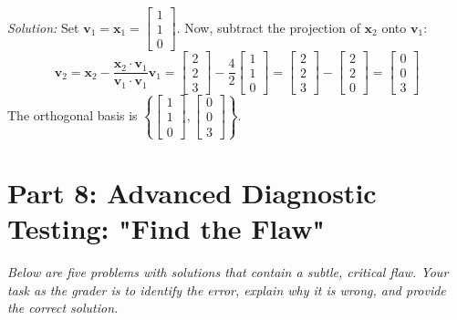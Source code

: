 \documentclass[11pt, letterpaper]{article}
\theoremstyle{definition}
\theoremstyle{remark}
\begin{document}
\textit{Solution:}
Set $\mathbf{v}_1 = \mathbf{x}_1 = \begin{bmatrix} 1 \\ 1 \\ 0 \end{bmatrix}$.
Now, subtract the projection of $\mathbf{x}_2$ onto $\mathbf{v}_1$:
\[ \mathbf{v}_2 = \mathbf{x}_2 - \frac{\mathbf{x}_2 \cdot \mathbf{v}_1}{\mathbf{v}_1 \cdot \mathbf{v}_1}\mathbf{v}_1 = \begin{bmatrix} 2 \\ 2 \\ 3 \end{bmatrix} - \frac{4}{2}\begin{bmatrix} 1 \\ 1 \\ 0 \end{bmatrix} = \begin{bmatrix} 2 \\ 2 \\ 3 \end{bmatrix} - \begin{bmatrix} 2 \\ 2 \\ 0 \end{bmatrix} = \begin{bmatrix} 0 \\ 0 \\ 3 \end{bmatrix} \]
The orthogonal basis is $\left\{ \begin{bmatrix} 1 \\ 1 \\ 0 \end{bmatrix}, \begin{bmatrix} 0 \\ 0 \\ 3 \end{bmatrix} \right\}$.

\newpage
\section{Part 8: Advanced Diagnostic Testing: "Find the Flaw"}

\textit{Below are five problems with solutions that contain a subtle, critical flaw. Your task as the grader is to identify the error, explain why it is wrong, and provide the correct solution.}
\end{document}
